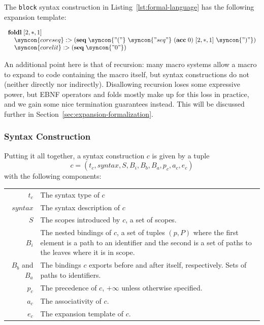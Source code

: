 \documentclass{kththesis}
\begin{document}
The \texttt{block} syntax construction in Listing~\ref{lst:formal-language} has the following expansion template:

$$
\begin{array}{l}
\foldl [2, *, 1] \\
\quad \syncon{coreseq} :> (\seq \syncon{"("}\ \syncon{"seq"}\ (\acc 0)\ [2, *, 1]\ \syncon{")"}) \\
\quad \syncon{corelit} :> (\seq \syncon{"0"}) \\
\end{array}
$$

An additional point here is that of recursion: many macro systems allow a macro to expand to code containing the macro itself, but syntax constructions do not (neither directly nor indirectly). Disallowing recursion loses some expressive power, but EBNF operators and folds mostly make up for this loss in practice, and we gain some nice termination guarantees instead. This will be discussed further in Section~\ref{sec:expansion-formalization}.

\subsubsection{Syntax Construction}

Putting it all together, a syntax construction $c$ is given by a tuple
$$ c = (t_c, syntax, S, B_i, B_b, B_a, p_c, a_c, e_c) $$
with the following components:

\begin{tabular}{r|p{10cm}}
$t_c$ & The syntax type of $c$ \\
$syntax$ & The syntax description of $c$ \\
$S$ & The scopes introduced by $c$, a set of scopes. \\
$B_i$ & The nested bindings of $c$, a set of tuples $(p, P)$ where the first element is a path to an identifier and the second is a set of paths to the leaves where it is in scope. \\
$B_b$ and $B_a$ & The bindings $c$ exports before and after itself, respectively. Sets of paths to identifiers. \\
$p_c$ & The precedence of $c$, $+\infty$ unless otherwise specified. \\
$a_c$ & The associativity of $c$. \\
$e_c$ & The expansion template of $c$. \\
\end{tabular}
\end{document}
